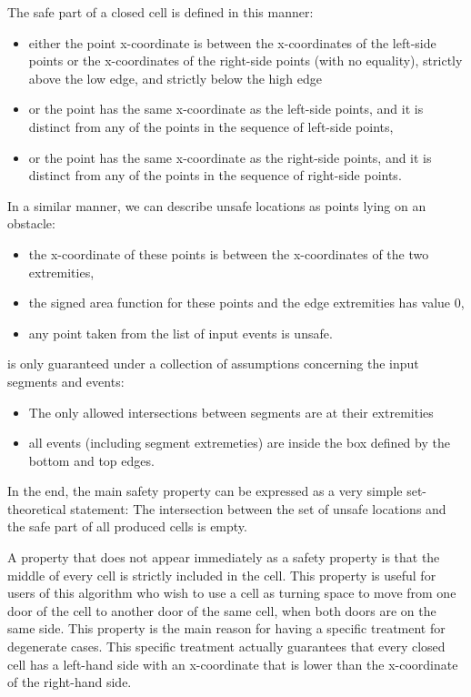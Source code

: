 \documentclass[a4paper, USenglish, cleveref, autoref, thm-restate]{lipics-v2021}
\begin{document}
The safe part of a closed cell is defined in this manner:
\begin{itemize}
\item either the point x-coordinate is between the x-coordinates of
  the left-side points or the x-coordinates of the right-side points
  (with no equality), strictly above the low edge, and strictly below
  the high edge
\item or the point has the same x-coordinate as the left-side points,
  and it is distinct from any of the points in the sequence of
  left-side points,
\item or the point has the same x-coordinate as the right-side points,
  and it is distinct from any of the points in the sequence of
  right-side points.
\end{itemize}

In a similar manner, we can describe unsafe locations as points lying
on an obstacle:
\begin{itemize}
\item the x-coordinate of these points is between the x-coordinates of
the two extremities,
\item the signed area function for these points and the edge
  extremities has value 0,
\item any point taken from the list of input events is unsafe.
\end{itemize}

is only guaranteed under a collection of
assumptions concerning the input segments and events:
\begin{itemize}
\item The only allowed intersections between segments are at their
  extremities
\item all events (including segment extremeties) are inside the box
 defined by the bottom and top edges.
\end{itemize}

In the end, the main safety property can be expressed as a very simple
set-theoretical statement:  The intersection between the set of unsafe
locations and the safe part of all produced cells is empty.

A property that does not appear immediately as a safety property is
that the middle of every cell is strictly included in the cell.  This
property is useful for users of this algorithm who wish to use a cell
as turning space to move from one door of the cell to another door of
the same cell, when both doors are on the same side.  This property is
the main reason for having a specific treatment for degenerate cases.
This specific treatment actually guarantees that every closed cell has
a left-hand side with an x-coordinate that is lower than the
x-coordinate of the right-hand side.
\end{document}
